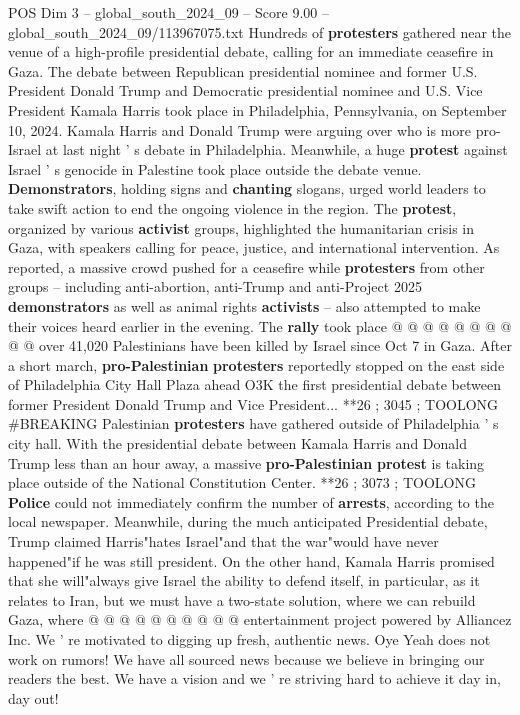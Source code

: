 \begin{textsample}{POS Dim 3 – global\_south\_2024\_09 – Score 9.00 – global\_south\_2024\_09/113967075.txt}  \label{ex:f3_pos_332}
Hundreds of \textbf{protesters} gathered near the venue of a high-profile presidential debate, calling for an immediate ceasefire in Gaza.
The debate between Republican presidential nominee and former U.S.
President Donald Trump and Democratic presidential nominee and U.S.
Vice President Kamala Harris took place in Philadelphia, Pennsylvania, on September 10, 2024.
Kamala Harris and Donald Trump were arguing over who is more pro-Israel at last night ' s debate in Philadelphia.
Meanwhile, a huge \textbf{protest} against Israel ' s genocide in Palestine took place outside the debate venue. \textbf{Demonstrators}, holding signs and \textbf{chanting} slogans, urged world leaders to take swift action to end the ongoing violence in the region.
The \textbf{protest}, organized by various \textbf{activist} groups, highlighted the humanitarian crisis in Gaza, with speakers calling for peace, justice, and international intervention.
As reported, a massive crowd pushed for a ceasefire while \textbf{protesters} from other groups -- including anti-abortion, anti-Trump and anti-Project 2025 \textbf{demonstrators} as well as animal rights \textbf{activists} -- also attempted to make their voices heard earlier in the evening.
The \textbf{rally} took place @ @ @ @ @ @ @ @ @ @ over 41,020 Palestinians have been killed by Israel since Oct 7 in Gaza.
After a short march, \textbf{pro-Palestinian} \textbf{protesters} reportedly stopped on the east side of Philadelphia City Hall Plaza ahead O3K the first presidential debate between former President Donald Trump and Vice President... **26 ; 3045 ; TOOLONG \#BREAKING Palestinian \textbf{protesters} have gathered outside of Philadelphia ' s city hall.
With the presidential debate between Kamala Harris and Donald Trump less than an hour away, a massive \textbf{pro-Palestinian} \textbf{protest} is taking place outside of the National Constitution Center. **26 ; 3073 ; TOOLONG \textbf{Police} could not immediately confirm the number of \textbf{arrests}, according to the local newspaper.
Meanwhile, during the much anticipated Presidential debate, Trump claimed Harris"hates Israel"and that the war"would have never happened"if he was still president.
On the other hand, Kamala Harris promised that she will"always give Israel the ability to defend itself, in particular, as it relates to Iran, but we must have a two-state solution, where we can rebuild Gaza, where @ @ @ @ @ @ @ @ @ @ entertainment project powered by Alliancez Inc.
We ' re motivated to digging up fresh, authentic news.
Oye Yeah does not work on rumors!
We have all sourced news because we believe in bringing our readers the best.
We have a vision and we ' re striving hard to achieve it day in, day out!

\end{textsample}
